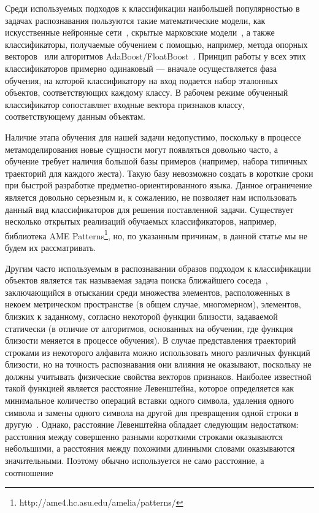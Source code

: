\documentclass[a5paper]{article}
\begin{document}
Среди используемых подходов к классификации наибольшей популярностью в задачах распознавания пользуются такие математические модели, как искусственные нейронные сети~\cite{neuronet1, neuronet2, neuronet3}, скрытые марковские модели~\cite{hmm1, hmm2, hmm3}, а также классификаторы, получаемые обучением с помощью, например, метода опорных векторов~\cite{svm1, svm2} или алгоритмов AdaBoost/FloatBoost~\cite{boosting1, boosting2}. Принцип работы у всех этих классификаторов примерно одинаковый --- вначале осуществляется фаза обучения, на которой классификатору на вход подается набор эталонных объектов, соответствующих каждому классу. В рабочем режиме обученный классификатор сопоставляет входные вектора признаков классу, соответствующему данным объектам.

Наличие этапа обучения для нашей задачи недопустимо, поскольку в процессе метамоделирования новые сущности могут появляться довольно часто, а обучение требует наличия большой базы примеров (например, набора типичных траекторий для каждого жеста). Такую базу невозможно создать в короткие сроки при быстрой разработке предметно-ориентированного языка. Данное ограничение является довольно серьезным и, к сожалению, не позволяет нам использовать данный вид классификаторов для решения поставленной задачи. Существует несколько открытых реализаций обучаемых классификаторов, например, библиотека AME Patterns\footnote{http://ame4.hc.asu.edu/amelia/patterns/}, но, по указанным причинам, в данной статье мы не будем их рассматривать.

Другим часто используемым в распознавании образов подходом к классификации объектов является так называемая задача поиска ближайшего соседа~\cite{nns1, nns2}, заключающийся в отыскании среди множества элементов, расположенных в некоем метрическом пространстве (в общем случае, многомерном), элементов, близких к заданному, согласно некоторой функции близости, задаваемой статически (в отличие от алгоритмов, основанных на обучении, где функция близости меняется в процессе обучения). В случае представления траекторий строками из некоторого алфавита можно использовать много различных функций близости, но на точность распознавания они влияния не оказывают, поскольку не должны учитывать физические свойства векторов признаков. Наиболее известной такой функцией является расстояние Левенштейна, которое определяется как минимальное количество операций вставки одного символа, удаления одного символа и замены одного символа на другой для превращения одной строки в другую~\cite{levenshtein}. Однако, расстояние Левенштейна обладает следующим недостатком: расстояния между совершенно разными короткими строками оказываются небольшими, а расстояния между похожими длинными словами оказываются значительными. Поэтому обычно используется не само расстояние, а соотношение 
\end{document}
